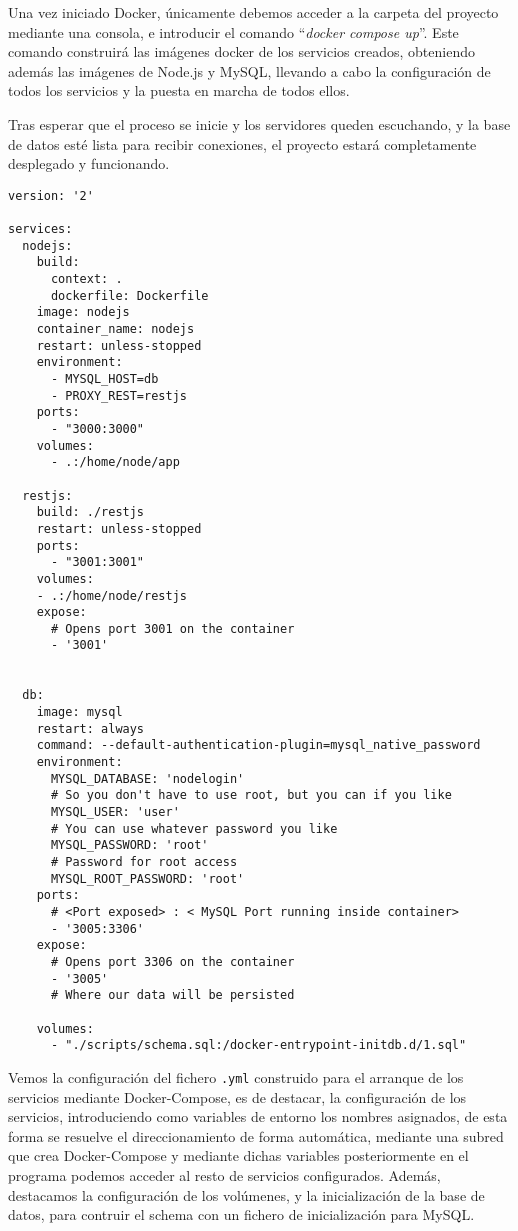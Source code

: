 Una vez iniciado Docker, únicamente debemos acceder a la carpeta del proyecto mediante una consola, e introducir el comando ``\emph{docker compose up}''.
Este comando construirá las imágenes docker de los servicios creados, obteniendo además las imágenes de Node.js y MySQL, llevando a cabo la configuración de todos los servicios y la puesta en marcha de todos ellos.

Tras esperar que el proceso se inicie y los servidores queden escuchando, y la base de datos esté lista para recibir conexiones, el proyecto estará completamente desplegado y funcionando.

\begin{lstlisting}
version: '2'

services:
  nodejs:
    build:
      context: .
      dockerfile: Dockerfile
    image: nodejs
    container_name: nodejs
    restart: unless-stopped
    environment:
      - MYSQL_HOST=db
      - PROXY_REST=restjs
    ports:
      - "3000:3000"
    volumes:
      - .:/home/node/app

  restjs:
    build: ./restjs
    restart: unless-stopped
    ports:
      - "3001:3001"
    volumes:
    - .:/home/node/restjs
    expose:
      # Opens port 3001 on the container
      - '3001'


  db:
    image: mysql
    restart: always
    command: --default-authentication-plugin=mysql_native_password
    environment:
      MYSQL_DATABASE: 'nodelogin'
      # So you don't have to use root, but you can if you like
      MYSQL_USER: 'user'
      # You can use whatever password you like
      MYSQL_PASSWORD: 'root'
      # Password for root access
      MYSQL_ROOT_PASSWORD: 'root'
    ports:
      # <Port exposed> : < MySQL Port running inside container>
      - '3005:3306'
    expose:
      # Opens port 3306 on the container
      - '3005'
      # Where our data will be persisted

    volumes:
      - "./scripts/schema.sql:/docker-entrypoint-initdb.d/1.sql"

\end{lstlisting}

Vemos la configuración del fichero {\tt .yml} construido para el arranque
de los servicios mediante Docker-Compose, es de destacar, la configuración
de los servicios, introduciendo como variables de entorno los nombres
asignados, de esta forma se resuelve el direccionamiento de forma
automática, mediante una subred que crea Docker-Compose y mediante dichas
variables posteriormente en el programa podemos acceder al resto de
servicios configurados. Además, destacamos la configuración de los
volúmenes, y la inicialización de la base de datos, para contruir el schema
con un fichero de inicialización para MySQL.



